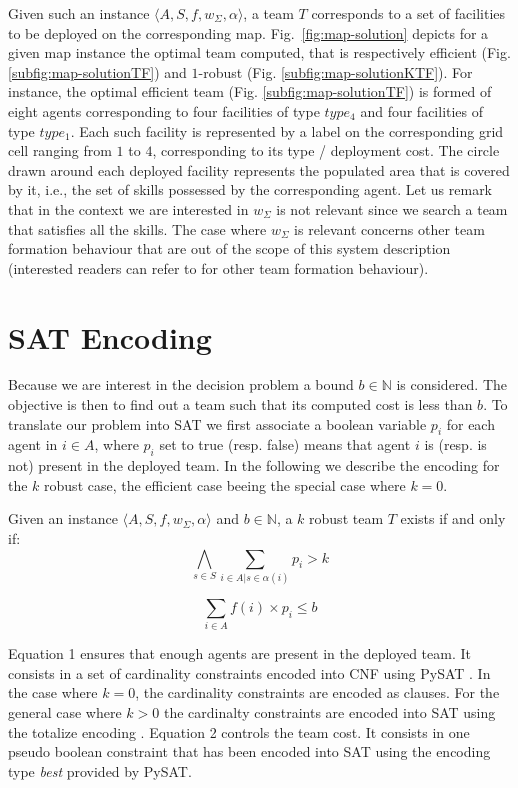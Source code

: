 \documentclass[conference]{IEEEtran}
\theoremstyle{definition}
\begin{document}
Given such an instance $\langle A, S, f, w_\Sigma, \alpha\rangle$, a team $T$ 
corresponds to a set of facilities to be deployed on the corresponding map.
Fig.~\ref{fig:map-solution} depicts for a given map instance the optimal team computed, that is
respectively efficient (Fig. \ref{subfig:map-solutionTF}) and $1$-robust (Fig. \ref{subfig:map-solutionKTF}).
For instance, the optimal efficient team (Fig. \ref{subfig:map-solutionTF}) 
is formed of eight agents corresponding to four facilities
of type $type_4$ and four facilities of type $type_1$. Each such facility 
is represented by a label on the corresponding grid cell
ranging from $1$ to $4$, corresponding to its type / deployment cost. 
The circle drawn around each deployed facility represents the populated area
that is covered by it, i.e., the set of skills possessed by the corresponding agent.
Let us remark that in the context we are interested in $w_\Sigma$ is not relevant since
we search a team that satisfies all the skills. The case where $w_\Sigma$ is relevant 
concerns other team formation behaviour that are out of the scope of this system description
(interested readers can refer to \cite{schwind2021} for other team formation behaviour).

\section{SAT Encoding}

Because we are interest in the decision problem a bound $b \in \mathbb{N}$ is considered.
The objective is then to find out a team such that its computed cost is less than $b$.
To translate our problem into SAT we first associate a boolean 
variable $p_i$ for each agent in $i \in A$, where $p_i$ set to true (resp. false)
means that agent $i$ is (resp. is not) present in the deployed team.
In the following we describe the encoding for the $k$ robust case, the efficient
case beeing the special case where $k=0$.

Given an instance $\langle A, S, f, w_\Sigma, \alpha\rangle$ and $b \in \mathbb{N}$, 
a $k$ robust team $T$ exists if and only if:
\begin{equation}
\bigwedge_{s \in S} \sum_{i \in A | s \in \alpha(i)} p_i > k
\end{equation}

\begin{equation}
\sum_{i \in A} f(i) \times p_i \leq b
\end{equation}

Equation 1 ensures that enough agents are present in the deployed team. 
It consists in a set of cardinality constraints encoded into CNF using PySAT \cite{imms-sat18}.
In the case where $k = 0$, the cardinality constraints are encoded as clauses. 
For the general case where $k > 0$ the cardinalty constraints are encoded into SAT using
the totalize encoding \cite{BailleuxB03}.
Equation 2 controls the team cost. It consists in one pseudo boolean constraint
that has been encoded into SAT using the encoding type \textit{best} provided by PySAT.
\end{document}
